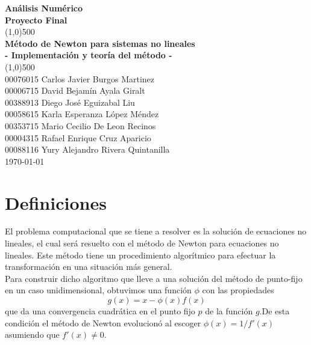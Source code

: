 ﻿\documentclass[11pt]{article}
\begin{document}
\begin{titlepage}

\begin{center}
\Large{\textbf{Análisis Numérico}}\\
\Large{\textbf{Proyecto Final}}\\
\vfill
\line(1,0){500}\\[1mm]

\huge{\textbf{Método de Newton para sistemas no lineales}}\\[3mm]
\Large{\textbf{- Implementación y teoría del método -}}\\[1mm]

\line(1,0){500}\\
\vfill
00076015 Carlos Javier Burgos Martinez\\
00006715 David Bejamín Ayala Giralt\\
00388913 Diego José Eguizabal Liu\\
00058615 Karla Esperanza López Méndez\\
00353715 Mario Cecilio De Leon Recinos\\
00004315 Rafael Enrique Cruz Aparicio \\
00088116 Yury Alejandro Rivera Quintanilla\\
\vfill
\today\\

\end{center}

\end{titlepage}

\tableofcontents
\thispagestyle{empty}
\clearpage

\setcounter{page}{1}

\section{Definiciones}

El problema computacional que se tiene a resolver es la solución de ecuaciones no lineales, el cual será resuelto con el método de Newton para ecuaciones no lineales. Este método tiene un procedimiento algorítmico para efectuar la transformación en una situación más general.\\

Para construir dicho algoritmo que lleve a una solución del método de punto-fijo en un caso unidimensional, obtuvimos una función $\phi$ con las propiedades $$g(x)=x-\phi(x)f(x)$$ que da una convergencia cuadrática en el punto fijo $p$ de la función $g$.De esta condición el método de Newton evolucionó al escoger $\phi(x)=1/f'(x)$ asumiendo que $f'(x)\neq0$.\\
\end{document}
